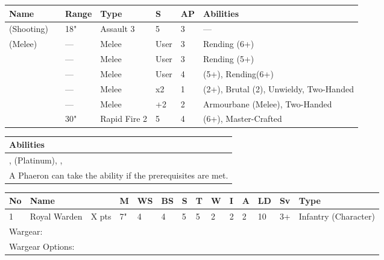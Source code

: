 \noindent
\begin{tabular}{||m{110pt} m{30pt} m{31pt} m{55pt} m{12pt} m{12pt} m{210pt}||}
	\hline
	Name & & Range & Type & S & AP & Abilities \\
	\hline
	\quickref{Staff of Light} (Shooting) & & 18" & Assault 3 & 5 & 3 & — \\
	\quickref{Staff of Light} (Melee) & & — & Melee & User & 3 & Rending (6+) \\
	\quickref{Hyperphase Sword} &  & — & Melee & User & 3 & Rending (5+) \\
	\quickref{Voidblade} &  & — & Melee & User & 4 & \quickref{Entropic Strike} (5+), Rending(6+) \\
	\quickref{Voidscythe} &  & — & Melee & x2 & 1 & \quickref{Entropic Strike} (2+), Brutal (2), Unwieldy, Two-Handed \\
	\quickref{Warscythe} &  & — & Melee & +2 & 2 & Armourbane (Melee), Two-Handed \\
	\quickref{Relic Gauss Blaster} & & 30" & Rapid Fire 2 & 5 & 4 & \quickref{Gauss} (6+), Master-Crafted \\
	\hline
\end{tabular}

\noindent
\begin{tabular}{||m{532pt}||}
	\hline
	Abilities \\
	\hline
	\quickref{Command Protocols}, \quickref{Nodal Command}(Platinum), \quickref{Living Metal}, \quickref{Reanimation Protocols} \\
	A Phaeron can take the \quickref{Tesserarion Nemesor} ability if the prerequisites are met. \\
	\hline
\end{tabular}



\newpage
{}

\noindent
\begin{tabular}{||m{10pt} m{95pt} m{30pt} m{11pt} m{11pt} m{11pt} m{11pt} m{11pt} m{11pt} m{11pt} m{11pt} m{11pt} m{11pt} m{125pt}||}
	\hline
	No & Name & & M & WS & BS & S & T & W & I & A & LD & Sv & Type \\
	\hline
	1 & Royal Warden & X pts & 7" & 4 & 4 & 5 & 5 & 2 & 2 & 2 & 10 & 3+ & Infantry (Character)\\
	\hline
	\hline
	\multicolumn{14}{||Z{532 pt}||}{Wargear: \quickref{Relic Gauss Blaster}}\\
	\multicolumn{14}{||Z{532 pt}||}{Wargear Options:} \\	
	\hline
\end{tabular}

